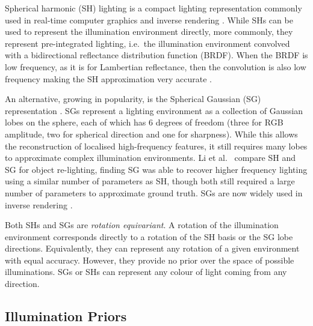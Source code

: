 Spherical harmonic (SH) lighting \cite{basri_lambertian_2003,ramamoorthi_efficient_2001} is a compact lighting representation commonly used in real-time computer graphics \cite{ramamoorthi_efficient_2001, green_spherical_2003, sloan_precomputed_2002} and inverse rendering \cite{yu_outdoor_2021, tsai_all-frequency_2006, li_inverse_2020, rudnev_nerf_2022, egger_occlusion-aware_2018}. While SHs can be used to represent the illumination environment directly, more commonly, they represent pre-integrated lighting, i.e.~the illumination environment convolved with a bidirectional reflectance distribution function (BRDF). When the BRDF is low frequency, as it is for Lambertian reflectance, then the convolution is also low frequency making the SH approximation very accurate \cite{basri_lambertian_2003}. 

An alternative, growing in popularity, is the Spherical Gaussian (SG) representation \cite{wang_all-frequency_2009, tsai_all-frequency_2006, zhang_physg_2021}. SGs represent a lighting environment as a collection of Gaussian lobes on the sphere, each of which has 6 degrees of freedom (three for RGB amplitude, two for spherical direction and one for sharpness). While this allows the reconstruction of localised high-frequency features, it still requires many lobes to approximate complex illumination environments. Li et al.~\cite{li_inverse_2020} compare SH and SG for object re-lighting, finding SG was able to recover higher frequency lighting using a similar number of parameters as SH, though both still required a large number of parameters to approximate ground truth. SGs are now widely used in inverse rendering \cite{zhang2021physg}.

Both SHs and SGs are \emph{rotation equivariant}. A rotation of the illumination environment corresponds directly to a rotation of the SH basis or the SG lobe directions. Equivalently, they can represent any rotation of a given environment with equal accuracy. However, they provide no prior over the space of possible illuminations. SGs or SHs can represent any colour of light coming from any direction.

\subsection{Illumination Priors} 

